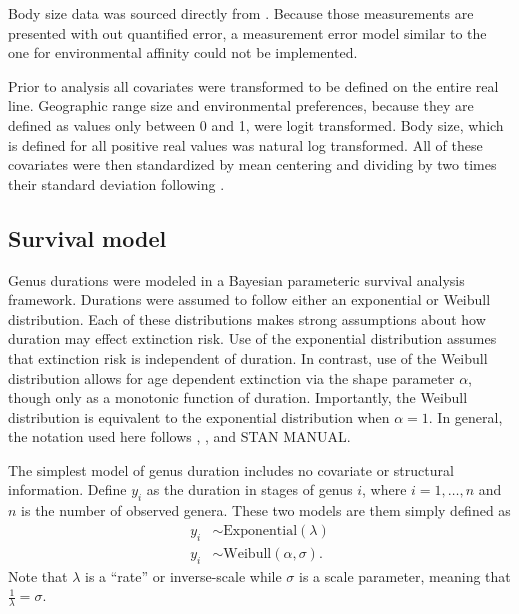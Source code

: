 \documentclass[12pt,letterpaper]{article}
\begin{document}
Body size data was sourced directly from \citet{Payne2014}. Because those measurements are presented with out quantified error, a measurement error model similar to the one for environmental affinity could not be implemented.

Prior to analysis all covariates were transformed to be defined on the entire real line. Geographic range size and environmental preferences, because they are defined as values only between 0 and 1, were logit transformed. Body size, which is defined for all positive real values was natural log transformed. All of these covariates were then standardized by mean centering and dividing by two times their standard deviation following \citet{Gelman2007}.


\subsection{Survival model}

Genus durations were modeled in a Bayesian parameteric survival analysis framework. Durations were assumed to follow either an exponential or Weibull distribution. Each of these distributions makes strong assumptions about how duration may effect extinction risk. Use of the exponential distribution assumes that extinction risk is independent of duration. In contrast, use of the Weibull distribution allows for age dependent extinction via the shape parameter \(\alpha\), though only as a monotonic function of duration. Importantly, the Weibull distribution is equivalent to the exponential distribution when \(\alpha = 1\). In general, the notation used here follows \citet{Gelman2007}, \citet{Gelman2013d}, and \uppercase{stan manual}.

The simplest model of genus duration includes no covariate or structural information. Define \(y_{i}\) as the duration in stages of genus \(i\), where \(i = 1, \dots, n\) and \(n\) is the number of observed genera. These two models are them simply defined as
\begin{equation}
  \begin{aligned}
    y_{i} &\sim \mathrm{Exponential}(\lambda) \\
    y_{i} &\sim \mathrm{Weibull}(\alpha, \sigma).
  \end{aligned}
  \label{eq:simple}
\end{equation}
Note that \(\lambda\) is a ``rate'' or inverse-scale while \(\sigma\) is a scale parameter, meaning that \(\frac{1}{\lambda} = \sigma\).

\end{document}

